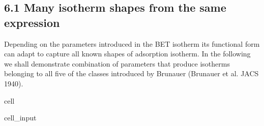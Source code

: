 \documentclass[letterpaper,10pt,english]{jupyterBook}
\begin{document}
\subsection{6.1 Many isotherm shapes from the same expression}
\label{\detokenize{BET_isotherm:many-isotherm-shapes-from-the-same-expression}}
\sphinxAtStartPar
Depending on the parameters introduced in the BET isotherm its functional form can adapt to capture all known shapes of adsorption isotherm. In the following we shall demonstrate combination of parameters that produce isotherms belonging to all five of the classes introduced by Brunauer (Brunauer et al. JACS 1940).

\begin{sphinxuseclass}{cell}\begin{sphinxVerbatimInput}

\begin{sphinxuseclass}{cell_input}
\begin{sphinxVerbatim}[commandchars=\\\{\}]
 

  \PYG{p}{[}\PYG{p}{]}


  \PYG{p}{[}     \PYG{p}{]}
  \PYG{p}{[}    \PYG{p}{]}
   \PYG{p}{[}   \PYG{p}{]}


\end{sphinxVerbatim}
\end{sphinxuseclass}
\end{sphinxVerbatimInput}
\end{sphinxuseclass}
\end{document}
